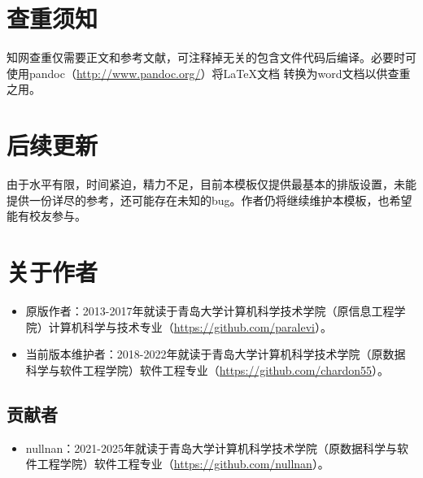 \section{查重须知}
知网查重仅需要正文和参考文献，可注释掉无关的包含文件代码后编译。必要时可使用pandoc（\url{http://www.pandoc.org/}）将\LaTeX 文档 转换为word文档以供查重之用。

\section{后续更新}
由于水平有限，时间紧迫，精力不足，目前本模板仅提供最基本的排版设置，未能提供一份详尽的参考，还可能存在未知的bug。作者仍将继续维护本模板，也希望能有校友参与。

\section{关于作者}
\begin{itemize}
    \item 原版作者：2013-2017年就读于青岛大学计算机科学技术学院（原信息工程学院）计算机科学与技术专业（\url{https://github.com/paralevi}）。
    \item 当前版本维护者：2018-2022年就读于青岛大学计算机科学技术学院（原数据科学与软件工程学院）软件工程专业（\url{https://github.com/chardon55}）。
\end{itemize}
\subsection{贡献者}
\begin{itemize}
    \item nullnan：2021-2025年就读于青岛大学计算机科学技术学院（原数据科学与软件工程学院）软件工程专业（\url{https://github.com/nullnan}）。
\end{itemize}